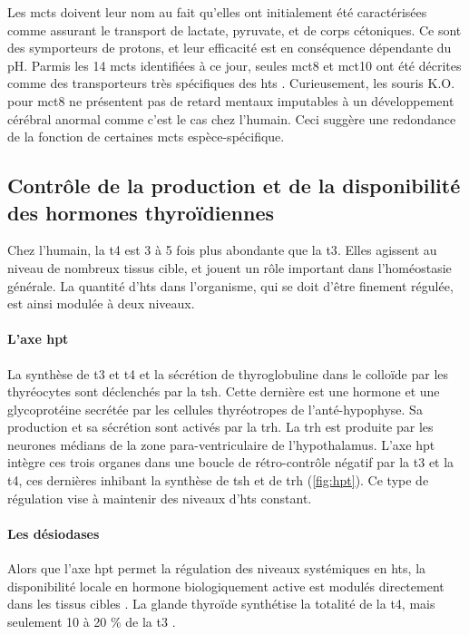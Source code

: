 Les \glspl{mct} doivent leur nom au fait qu'elles ont initialement été caractérisées comme assurant le transport de lactate, pyruvate, et de corps cétoniques.
Ce sont des symporteurs de protons, et leur efficacité est en conséquence dépendante du pH.
Parmis les 14 \glspl{mct} identifiées à ce jour, seules \gls{mct}8 et \gls{mct}10 ont été décrites comme des transporteurs très spécifiques des \glspl{ht} \citep{Friesema2003,Friesema2008}.
Curieusement, les souris K.O. pour \gls{mct}8 ne présentent pas de retard mentaux imputables à un développement cérébral anormal comme c'est le cas chez l'humain.
Ceci suggère une redondance de la fonction de certaines \glspl{mct} espèce-spécifique.


\subsection{Contrôle de la production et de la disponibilité des hormones thyroïdiennes}
Chez l'humain, la \gls{t4} est 3 à 5 fois plus abondante que la \gls{t3}. Elles agissent au niveau de nombreux tissus cible, et jouent un rôle important dans l'homéostasie générale.
La quantité d'\glspl{ht} dans l'organisme, qui se doit d'être finement régulée, est ainsi modulée à deux niveaux.

\paragraph{L'axe \gls{hpt}}\label{par:hpt}
La synthèse de \gls{t3} et \gls{t4} et la sécrétion de thyroglobuline dans le colloïde par les thyréocytes sont déclenchés par la \gls{tsh}.
Cette dernière est une hormone et une glycoprotéine secrétée par les cellules thyréotropes de l'anté-hypophyse.
Sa production et sa sécrétion sont activés par la \gls{trh}.
La \gls{trh} est produite par les neurones médians de la zone para-ventriculaire de l'hypothalamus.
L'axe  \gls{hpt} intègre ces trois organes dans une boucle de rétro-contrôle négatif par la \gls{t3} et la \gls{t4}, ces dernières inhibant la synthèse de \gls{tsh} \citep{Larsen1982} et de \gls{trh} \citep{Koller1987a} (\autoref{fig:hpt}).
Ce type de régulation vise à maintenir des niveaux d'\glspl{ht} constant.



\paragraph{Les désiodases}
Alors que l'axe \gls{hpt} permet la régulation des niveaux systémiques en \glspl{ht}, la disponibilité locale en hormone biologiquement active est modulés directement dans les tissus cibles \citep{Bianco2006}.
La glande thyroïde synthétise la totalité de la \gls{t4}, mais seulement 10 à 20 \% de la \gls{t3} \citep{Laurberg1984}.

